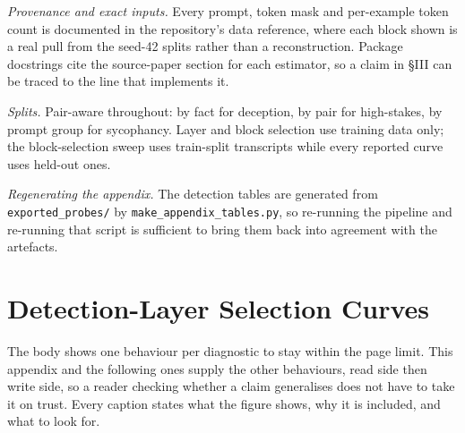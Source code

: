 \documentclass[conference]{IEEEtran}
\begin{document}
\emph{Provenance and exact inputs.} Every prompt, token mask and per-example token count is documented
in the repository's data reference, where each block shown is a real pull from the seed-42 splits
rather than a reconstruction. Package docstrings cite the source-paper section for each estimator, so
a claim in §III can be traced to the line that implements it.

\emph{Splits.} Pair-aware throughout: by fact for deception, by pair for high-stakes, by prompt group
for sycophancy. Layer and block selection use training data only; the block-selection sweep uses
train-split transcripts while every reported curve uses held-out ones.

\emph{Regenerating the appendix.} The detection tables are generated from
\texttt{exported\_probes/} by \texttt{make\_appendix\_tables.py}, so re-running the pipeline and
re-running that script is sufficient to bring them back into agreement with the artefacts.

\onecolumn
\raggedbottom

\section{Detection-Layer Selection Curves}\label{app:layer-curves}

The body shows one behaviour per diagnostic to stay within the page limit. This appendix and the
following ones supply the other behaviours, read side then write side, so a reader checking whether a
claim generalises does not have to take it on trust. Every caption states what the figure shows, why
it is included, and what to look for.
\end{document}
